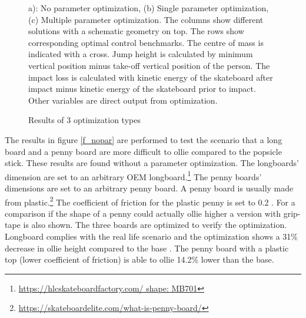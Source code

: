 \documentclass[default,iicol]{sn-jnl}
\begin{document}
{\begin{figure}[!t]
    \vspace{0.2cm}
    \caption[Geometries of optimization solutions]{Results of 3 optimization types}
    a): No parameter optimization, (b) Single parameter optimization, (c) Multiple parameter optimization. The columns show different solutions with a schematic geometry on top. The rows show corresponding optimal control benchmarks. The centre of mass is indicated with a cross. Jump height is calculated by minimum vertical position minus take-off vertical position of the person. The impact loss is calculated with kinetic energy of the skateboard after impact minus kinetic energy of the skateboard prior to impact. Other variables are direct output from optimization.
\end{figure}

\noindent The results in figure \ref{f_nopar} are performed to test the scenario that a long board and a penny board are more difficult to ollie compared to the popsicle stick. These results are found without a parameter optimization. The longboards' dimension are set to an arbitrary OEM longboard.\footnote{\url{https://hlcskateboardfactory.com/ shape: MB701}} The penny boards' dimensions are set to an arbitrary penny board. A penny board is usually made from plastic.\footnote{\url{https://skateboardelite.com/what-is-penny-board/}} The coefficient of friction for the plastic penny is set to 0.2 \cite{bani-hani_data_2019}. For a comparison if the shape of a penny could actually ollie higher a version with grip-tape is also shown. The three boards are optimized to verify the optimization. Longboard complies with the real life scenario and the optimization shows a 31\% decrease in ollie height compared to the base . The penny board with a plastic top (lower coefficient of friction) is able to ollie 14.2\% lower than the base.

}
\end{document}
